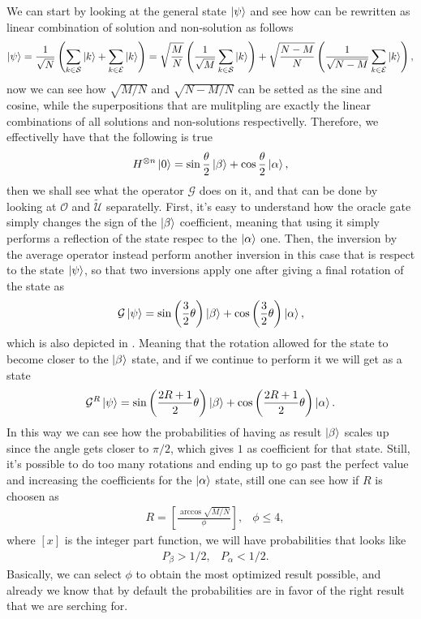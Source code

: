{
    We can start by looking at the general state $\ket{\psi}$ and see how can be rewritten as linear combination of solution and non-solution as follows
    \begin{equation}
        \ket{\psi} = \frac{1}{\sqrt{N}}\left( \sum_{k\in \mathcal{S}}\ket{k} + \sum_{k\in\mathcal{E}}\ket{k} \right) = \sqrt{\frac{M}{N}}\left( \frac{1}{\sqrt{M}}\sum_{k\in \mathcal{S}}\ket{k} \right) + \sqrt{\frac{N-M}{N}}\left( \frac{1}{\sqrt{N-M}}\sum_{k\in \mathcal{E}}\ket{k} \right),
    \end{equation}
    now we can see how $\sqrt{M/N}$ and $\sqrt{N-M/N}$ can be setted as the sine and cosine, while the superpositions that are mulitpling are exactly the linear combinations of all solutions and non-solutions respectivelly. Therefore, we effectivelly have that the following is true
    \begin{align}
        H^{\otimes n}\ket{0} = \sin\frac{\theta}{2}\ket{\beta} + \cos\frac{\theta}{2}\ket{\alpha},
    \end{align}
    then we shall see what the operator $\mathcal{G}$ does on it, and that can be done by looking at $\mathcal{O}$ and $\tilde{\mathcal{U}}$ separatelly. First, it's easy to understand how the oracle gate simply changes the sign of the $\ket{\beta}$ coefficient, meaning that using it simply performs a reflection of the state respec to the $\ket{\alpha}$ one. Then, the inversion by the average operator instead perform another inversion in this case that is respect to the state $\ket{\psi}$, so that two inversions apply one after giving a final rotation of the state as
    \begin{equation}
        \mathcal{G}\ket{\psi} = \sin\left( \frac{3}{2}\theta \right)\ket{\beta} + \cos\left( \frac{3}{2}\theta \right)\ket{\alpha},
    \end{equation}
    which is also depicted in . Meaning that the rotation allowed for the state to become closer to the $\ket{\beta}$ state, and if we continue to perform it we will get as a state
    \begin{equation}
        \mathcal{G}^R\ket{\psi} = \sin\left( \frac{2R + 1}{2}\theta \right)\ket{\beta} + \cos\left( \frac{2R + 1}{2}\theta \right)\ket{\alpha}.
    \end{equation}
    In this way we can see how the probabilities of having as result $\ket{\beta}$ scales up since the angle gets closer to $\pi/2$, which gives $1$ as coefficient for that state. Still, it's possible to do too many rotations and ending up to go past the perfect value and increasing the coefficients for the $\ket{\alpha}$ state, still one can see how if $R$ is choosen as
    \begin{align}
        &R = \left[ \frac{\arccos\sqrt{M/N}}{\phi} \right], &\phi \le 4,
    \end{align}
    where $\left[ x \right]$ is the integer part function, we will have probabilities that looks like
    \begin{align}
        &P_\beta > 1/2, &P_\alpha < 1/2.
    \end{align}
    Basically, we can select $\phi$ to obtain the most optimized result possible, and already we know that by default the probabilities are in favor of the right result that we are serching for.
}
